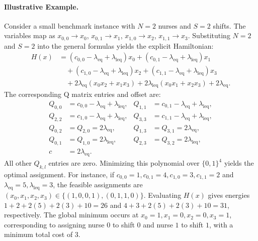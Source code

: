 \documentclass[12pt]{article}
\begin{document}
\paragraph{Illustrative Example.}
Consider a small benchmark instance with $N=2$ nurses and $S=2$ shifts. The variables map as $x_{0,0} \to x_0$, $x_{0,1} \to x_1$, $x_{1,0} \to x_2$, $x_{1,1} \to x_3$. Substituting $N=2$ and $S=2$ into the general formulas yields the explicit Hamiltonian:
\begin{align}
H(x) &= (c_{0,0} - \lambda_{\text{eq}} + \lambda_{\text{leq}})x_0 + (c_{0,1} - \lambda_{\text{eq}} + \lambda_{\text{leq}})x_1 \nonumber \\
&\quad + (c_{1,0} - \lambda_{\text{eq}} + \lambda_{\text{leq}})x_2 + (c_{1,1} - \lambda_{\text{eq}} + \lambda_{\text{leq}})x_3 \nonumber \\
&\quad + 2\lambda_{\text{eq}}(x_0 x_2 + x_1 x_3) + 2\lambda_{\text{leq}}(x_0 x_1 + x_2 x_3) + 2\lambda_{\text{eq}}.
\end{align}
The corresponding Q matrix entries and offset are:
\begin{align}
Q_{0,0} &= c_{0,0} - \lambda_{\text{eq}} + \lambda_{\text{leq}}, & Q_{1,1} &= c_{0,1} - \lambda_{\text{eq}} + \lambda_{\text{leq}}, \\
Q_{2,2} &= c_{1,0} - \lambda_{\text{eq}} + \lambda_{\text{leq}}, & Q_{3,3} &= c_{1,1} - \lambda_{\text{eq}} + \lambda_{\text{leq}}, \\
Q_{0,2} &= Q_{2,0} = 2\lambda_{\text{eq}}, & Q_{1,3} &= Q_{3,1} = 2\lambda_{\text{eq}}, \\
Q_{0,1} &= Q_{1,0} = 2\lambda_{\text{leq}}, & Q_{2,3} &= Q_{3,2} = 2\lambda_{\text{leq}}, \\
c &= 2\lambda_{\text{eq}}.
\end{align}
All other $Q_{k,l}$ entries are zero. Minimizing this polynomial over $\{0,1\}^4$ yields the optimal assignment. For instance, if $c_{0,0}=1, c_{0,1}=4, c_{1,0}=3, c_{1,1}=2$ and $\lambda_{\text{eq}}=5, \lambda_{\text{leq}}=3$, the feasible assignments are $(x_0,x_1,x_2,x_3) \in \{(1,0,0,1), (0,1,1,0)\}$. Evaluating $H(x)$ gives energies $1+2+2(5)+2(3)+10 = 26$ and $4+3+2(5)+2(3)+10 = 31$, respectively. The global minimum occurs at $x_0=1, x_1=0, x_2=0, x_3=1$, corresponding to assigning nurse $0$ to shift $0$ and nurse $1$ to shift $1$, with a minimum total cost of $3$.
\end{document}
